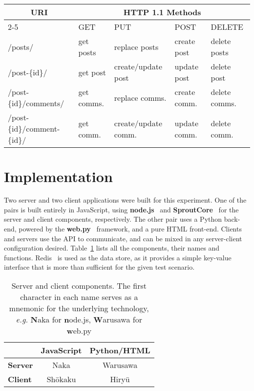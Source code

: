 \documentclass[letterpaper,twocolumn,10pt,draft]{article}
\begin{document}
\begin{table*}
    \begin{tabular}{*{5}l}
        \toprule
        \multicolumn{1}{c}{\textbf{URI}} & \multicolumn{4}{c}{\textbf{HTTP 1.1 Methods}} \\
        \cmidrule{2-5}
        & GET & PUT & POST & DELETE \\
        \midrule
        /posts/ & get posts & replace posts & create post & delete posts \\
        /post-\{id\}/ & get post & create/update post & update post & delete post \\
        /post-\{id\}/comments/ & get comms. & replace comms. & create comm. & delete comms. \\
        /post-\{id\}/comment-\{id\}/ & get comm. & create/update comm. & update comm. & delete comm. \\
        \bottomrule
    \end{tabular}
    \caption{API methods}
    \label{tab:api}
\end{table*}

\section{\label{sec:impl}Implementation}

Two server and two client applications were built for this experiment. One of the pairs is built entirely in JavaScript, using \textbf{node.js}~\cite{node} and \textbf{SproutCore}~\cite{sprout} for the server and client components, respectively. The other pair uses a Python back-end, powered by the \textbf{web.py}~\cite{webpy} framework, and a pure HTML front-end. Clients and servers use the API to communicate, and can be mixed in any server-client configuration desired. Table~\ref{tab:comps} lists all the components, their names and functions. Redis~\cite{redis} is used as the data store, as it provides a simple key-value interface that is more than sufficient for the given test scenario.

\begin{table}
    \begin{center}
        \begin{tabular}{l c c}
            \toprule
            & \textbf{JavaScript} & \textbf{Python/HTML} \\
            \midrule
            \textbf{Server} & Naka & Warusawa \\
            \textbf{Client} & Sh\={o}kaku & Hiry\={u}\\
            \bottomrule
        \end{tabular}
        \caption{Server and client components. The first character in each name serves as a mnemonic for the underlying technology, \emph{e.g.} \textbf{N}aka for \textbf{n}ode.js, \textbf{W}arusawa for \textbf{w}eb.py}
        \label{tab:comps}
    \end{center}
\end{table}
\end{document}

